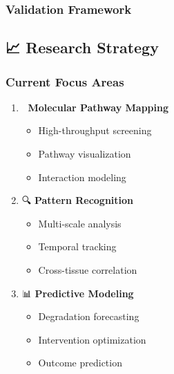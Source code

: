 \subsubsection{Validation Framework}\label{validation-framework}

\begin{Shaded}
\begin{Highlighting}[]
\end{Highlighting}
\end{Shaded}

\subsection{📈 Research Strategy}\label{research-strategy}

\subsubsection{Current Focus Areas}\label{current-focus-areas}

\begin{enumerate}
\def\labelenumi{\arabic{enumi}.}
\tightlist
\item
  🧬 \textbf{Molecular Pathway Mapping}

  \begin{itemize}
  \tightlist
  \item
    High-throughput screening
  \item
    Pathway visualization
  \item
    Interaction modeling
  \end{itemize}
\item
  🔍 \textbf{Pattern Recognition}

  \begin{itemize}
  \tightlist
  \item
    Multi-scale analysis
  \item
    Temporal tracking
  \item
    Cross-tissue correlation
  \end{itemize}
\item
  📊 \textbf{Predictive Modeling}

  \begin{itemize}
  \tightlist
  \item
    Degradation forecasting
  \item
    Intervention optimization
  \item
    Outcome prediction
  \end{itemize}
\end{enumerate}

